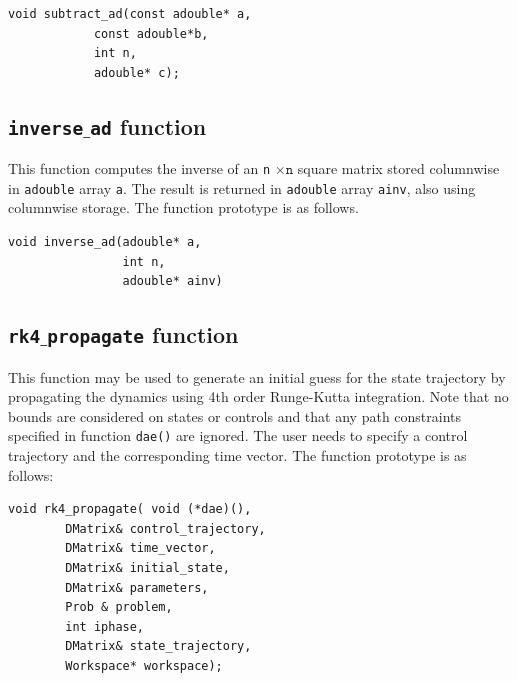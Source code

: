 \documentclass[a4paper,11pt]{report}    %
\begin{document}
\begin{verbatim}
void subtract_ad(const adouble* a, 
            const adouble*b, 
            int n, 
            adouble* c);
\end{verbatim}


\subsection{ \texttt{inverse$\_$ad} function}
This function  computes the inverse of  an \texttt{n} $\times  \texttt{n}$ square matrix  stored columnwise in \texttt{adouble} array \texttt{a}.
The result is returned in \texttt{adouble} array \texttt{ainv}, also using columnwise storage.  The function prototype is as follows.

\begin{verbatim}
void inverse_ad(adouble* a, 
                int n, 
                adouble* ainv)
\end{verbatim}



\subsection{ \texttt{rk4$\_$propagate} function }

This function may be used to generate an initial guess for the state trajectory by propagating the dynamics
using 4th order Runge-Kutta integration. Note that no bounds are considered on states or controls and that
any path constraints specified in function \verb|dae()| are ignored. The user needs to specify a control
trajectory and the corresponding time vector. The function prototype is as follows:

\begin{verbatim}
void rk4_propagate( void (*dae)(), 
        DMatrix& control_trajectory, 
        DMatrix& time_vector,
        DMatrix& initial_state,
        DMatrix& parameters,
        Prob & problem, 
        int iphase,
        DMatrix& state_trajectory,
        Workspace* workspace); 
\end{verbatim}
\end{document}

